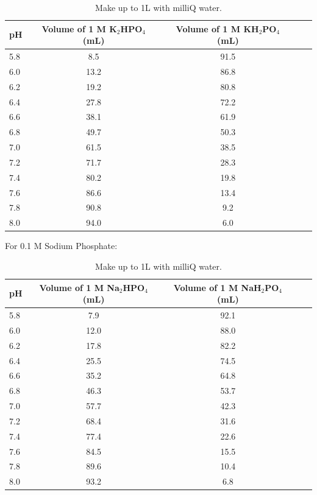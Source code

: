 \documentclass{tufte-book} %
\begin{document}
\begin{table}[ht]
  \centering
  \selectfont
  \begin{tabular}{lcccl}
    \toprule
    pH & Volume of 1 M K$_{2}$HPO$_{4}$ (mL) & Volume of 1 M KH$_{2}$PO$_{4}$ (mL) \\
    \midrule
    5.8 & 8.5 & 91.5	 \\
    6.0 & 13.2 & 86.8	 \\
    6.2 & 19.2 & 80.8	 \\
    6.4 & 27.8 & 72.2	 \\
    6.6 & 38.1 & 61.9	 \\
    6.8 & 49.7 & 50.3	 \\
    7.0 & 61.5 & 38.5	 \\
    7.2 & 71.7 & 28.3	 \\
    7.4 & 80.2 & 19.8	 \\
    7.6 & 86.6 & 13.4	 \\
    7.8 & 90.8 & 9.2	 \\
    8.0 & 94.0 & 6.0	 \\


    \bottomrule
  \end{tabular}
  \caption{Make up to 1L with milliQ water.}
  \label{tab:Kphos}
\end{table}


For 0.1 M Sodium Phosphate:

\begin{table}[ht]
  \centering
  \selectfont
  \begin{tabular}{lcccl}
    \toprule
    pH & Volume of 1 M Na$_{2}$HPO$_{4}$ (mL) & Volume of 1 M NaH$_{2}$PO$_{4}$ (mL) \\
    \midrule
    5.8 & 7.9 & 92.1	 \\
    6.0 & 12.0 & 88.0	 \\
    6.2 & 17.8 & 82.2	 \\
    6.4 & 25.5 & 74.5	 \\
    6.6 & 35.2 & 64.8	 \\
    6.8 & 46.3 & 53.7	 \\
    7.0 & 57.7 & 42.3	 \\
    7.2 & 68.4 & 31.6	 \\
    7.4 & 77.4 & 22.6	 \\
    7.6 & 84.5 & 15.5	 \\
    7.8 & 89.6 & 10.4	 \\
    8.0 & 93.2 & 6.8	 \\


    \bottomrule
  \end{tabular}
  \caption{Make up to 1L with milliQ water.}
  \label{tab:Naphos}
\end{table}
\end{document}

